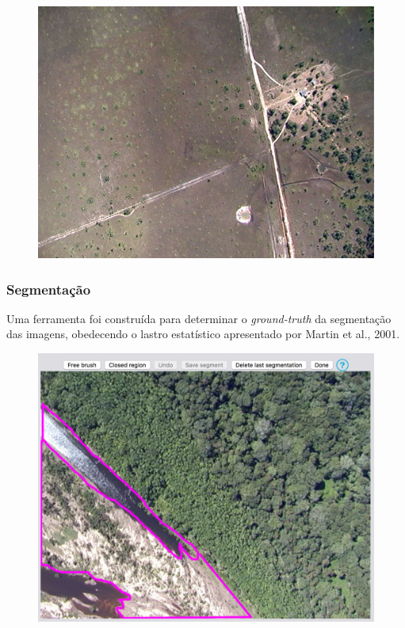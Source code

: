 \documentclass[t]{beamer}
\begin{document}
\begin{frame}
\begin{multicols}{3}
\begin{figure}
		\end{figure}
		\begin{figure}
			\includegraphics[scale=0.3]{imgs/amostra3}
		\end{figure}
	\end{multicols}

\end{frame}

\begin{frame}
	\frametitle{Segmentação}

	Uma ferramenta foi construída para determinar o \textit{ground-truth} da segmentação das imagens, obedecendo o lastro estatístico apresentado por Martin et al., 2001.

	\begin{figure}[h]
  		\centering
		\includegraphics[scale=0.25]{imgs/manualseg}
	\end{figure}

\end{frame}
\end{document}
